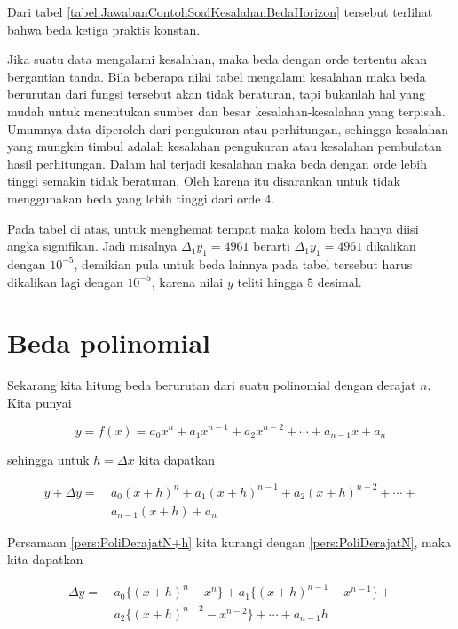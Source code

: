 Dari tabel \ref{tabel:JawabanContohSoalKesalahanBedaHorizon} tersebut terlihat bahwa beda ketiga praktis konstan.

Jika suatu data mengalami kesalahan, maka beda dengan orde tertentu akan bergantian tanda. Bila beberapa nilai tabel mengalami kesalahan maka beda berurutan dari fungsi tersebut akan tidak beraturan, tapi bukanlah hal yang mudah untuk menentukan sumber dan besar kesalahan-kesalahan yang terpisah. Umumnya data diperoleh dari pengukuran atau perhitungan, sehingga kesalahan yang mungkin timbul adalah kesalahan pengukuran atau kesalahan pembulatan hasil perhitungan. Dalam hal terjadi kesalahan maka beda dengan orde lebih tinggi semakin tidak beraturan. Oleh karena itu disarankan untuk tidak menggunakan beda yang lebih tinggi dari orde 4.

Pada tabel di atas, untuk menghemat tempat maka kolom beda hanya diisi angka signifikan. Jadi misalnya $\Delta_1 y_1 = 4961$ berarti $\Delta_1 y_1 = 4961$ dikalikan dengan $10^{-5}$, demikian pula untuk beda lainnya pada tabel tersebut harus dikalikan lagi dengan $10^{-5}$, karena nilai $y$ teliti hingga $5$ desimal.

\section{Beda polinomial}
Sekarang kita hitung beda berurutan dari suatu polinomial dengan derajat $n$. Kita punyai

\begin{equation}\label{pers:PoliDerajatN}
y = f(x) = a_0 x^n + a_1 x^{n-1} + a_2 x^{n-2} + \cdots + a_{n-1} x + a_n
\end{equation}

sehingga untuk $h = \Delta x$ kita dapatkan

\begin{equation}\label{pers:PoliDerajatN+h}
\begin{split}
y + \Delta y =~& a_0 (x+h)^n + a_1(x+h)^{n-1} + a_2(x+h)^{n-2} + \cdots + \\
&a_{n-1}(x+h) + a_n
\end{split}
\end{equation}

Persamaan \ref{pers:PoliDerajatN+h} kita kurangi dengan \ref{pers:PoliDerajatN}, maka kita dapatkan

\begin{equation}\label{pers:BedaPolinomial}
\begin{split}
\Delta y =~& a_0\{(x+h)^n - x^n\} + a_1\{(x+h)^{n-1} - x^{n-1}\} + \\
&a_2\{(x+h)^{n-2} - x^{n-2}\} + \cdots + a_{n-1}h
\end{split}
\end{equation}

